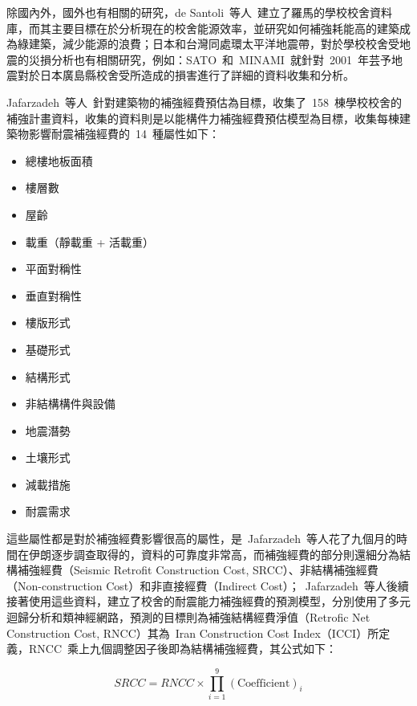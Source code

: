 除國內外，國外也有相關的研究，de Santoli~等人\cite{de2014energy}~建立了羅馬的學校校舍資料庫，而其主要目標在於分析現在的校舍能源效率，並研究如何補強耗能高的建築成為綠建築，減少能源的浪費；日本和台灣同處環太平洋地震帶，對於學校校舍受地震的災損分析也有相關研究，例如：SATO~和~MINAMI\cite{SATOShinji:2004-12}~就針對~2001~年芸予地震對於日本廣島縣校舍受所造成的損害進行了詳細的資料收集和分析。

Jafarzadeh~等人\cite{jafarzadeh2014seismic}~針對建築物的補強經費預估為目標，收集了~158~棟學校校舍的補強計畫資料，收集的資料則是以能構件力補強經費預估模型為目標，收集每棟建築物影響耐震補強經費的~14~種屬性如下：

  \begin{multicols}{2}
  \begin{itemize}
  \item 總樓地板面積
  \item 樓層數
  \item 屋齡
  \item 載重（靜載重 + 活載重）
  \item 平面對稱性
  \item 垂直對稱性
  \item 樓版形式
  \item 基礎形式
  \item 結構形式
  \item 非結構構件與設備
  \item 地震潛勢
  \item 土壤形式
  \item 減載措施
  \item 耐震需求
  \end{itemize}
  \end{multicols}

這些屬性都是對於補強經費影響很高的屬性\cite{jafarzadeh2012seismic}，是~Jafarzadeh~等人花了九個月的時間在伊朗逐步調查取得的，資料的可靠度非常高，而補強經費的部分則還細分為結構補強經費（Seismic Retrofit Construction Cost, SRCC）、非結構補強經費（Non-construction Cost）和非直接經費（Indirect Cost）；~Jafarzadeh~等人後續接著使用這些資料，建立了校舍的耐震能力補強經費的預測模型，分別使用了多元迴歸分析\cite{jafarzadeh2013predicting}和類神經網路\cite{jafarzadeh2013application}，預測的目標則為補強結構經費淨值（Retrofic Net Construction Cost, RNCC）其為~Iran Construction Cost Index（ICCI）所定義，RNCC~乘上九個調整因子後即為結構補強經費，其公式如下：

    \begin{equation}SRCC = RNCC \times \prod_{i=1}^9 (\text{Coefficient})_i \end{equation} 

